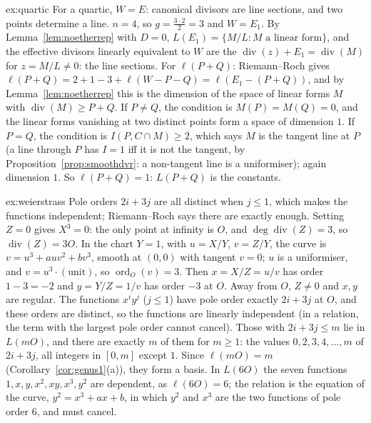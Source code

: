 \begin{solution}{ex:quartic}
\idea For a quartic, $W=E$: canonical divisors are line sections, and two points determine a line.
\writeup $n=4$, so $g=\frac{3\cdot2}2=3$ and $W=E_1$. By Lemma~\ref{lem:noetherrep} with $D=0$, $L(E_1)=\{M/L:M\text{ a linear form}\}$, and the effective
divisors linearly equivalent to $W$ are the $\operatorname{div}(z)+E_1=\operatorname{div}(M)$ for $z=M/L\ne0$: the line sections. For $\ell(P+Q)$: Riemann--Roch gives
$\ell(P+Q)=2+1-3+\ell(W-P-Q)=\ell(E_1-(P+Q))$, and by Lemma~\ref{lem:noetherrep} this is the dimension of the space of linear forms $M$ with
$\operatorname{div}(M)\ge P+Q$. If $P\ne Q$, the condition is $M(P)=M(Q)=0$, and the linear forms vanishing at two distinct points form a space of dimension $1$.
If $P=Q$, the condition is $I(P,C\cap M)\ge2$, which says $M$ is the tangent line at $P$ (a line through $P$ has $I=1$ iff it is not the tangent, by
Proposition~\ref{prop:smoothdvr}: a non-tangent line is a uniformiser); again dimension $1$. So $\ell(P+Q)=1$: $L(P+Q)$ is the constants.
\end{solution}

\begin{solution}{ex:weierstrass}
\idea Pole orders $2i+3j$ are all distinct when $j\le1$, which makes the functions independent; Riemann--Roch says there are exactly enough.
\writeup Setting $Z=0$ gives $X^3=0$: the only point at infinity is $O$, and $\deg\operatorname{div}(Z)=3$, so $\operatorname{div}(Z)=3O$. In the chart $Y=1$, with
$u=X/Y$, $v=Z/Y$, the curve is $v=u^3+auv^2+bv^3$, smooth at $(0,0)$ with tangent $v=0$; $u$ is a uniformiser, and $v=u^3\cdot(\text{unit})$, so
$\operatorname{ord}_O(v)=3$. Then $x=X/Z=u/v$ has order $1-3=-2$ and $y=Y/Z=1/v$ has order $-3$ at $O$. Away from $O$, $Z\ne0$ and $x,y$ are regular. The
functions $x^iy^j$ ($j\le1$) have pole order exactly $2i+3j$ at $O$, and these orders are distinct, so the functions are linearly independent (in a
relation, the term with the largest pole order cannot cancel). Those with $2i+3j\le m$ lie in $L(mO)$, and there are exactly $m$ of them for
$m\ge1$: the values $0,2,3,4,\dots,m$ of $2i+3j$, all integers in $[0,m]$ except $1$. Since $\ell(mO)=m$ (Corollary~\ref{cor:genus1}(a)), they form a basis.
In $L(6O)$ the seven functions $1,x,y,x^2,xy,x^3,y^2$ are dependent, as $\ell(6O)=6$; the relation is the equation of the curve, $y^2=x^3+ax+b$, in which
$y^2$ and $x^3$ are the two functions of pole order $6$, and must cancel.
\end{solution}

